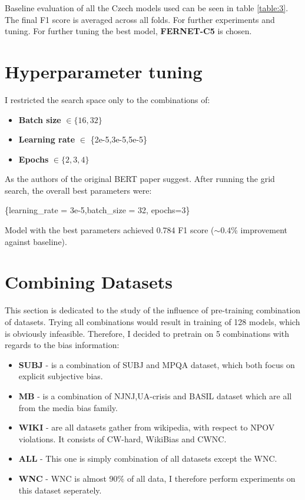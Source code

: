  Baseline evaluation of all the Czech models used can be seen in table \ref{table:3}. The final F1 score is averaged across all folds. For further experiments and tuning. For further tuning the best model, \textbf{FERNET-C5} is chosen.
 

 
 

 
 
 
 
 
 \section{Hyperparameter tuning}
I restricted the search space only to the combinations of:
 \begin{itemize}
     \item \textbf{Batch size} $\in \{16,32\}$
     \item \textbf{Learning rate} $\in $ \{2e-5,3e-5,5e-5\}
     \item \textbf{Epochs} $\in \{2,3,4\}$
 \end{itemize}
 
 As the authors of the original BERT paper suggest.  After running the grid search, the overall best parameters were:
 \begin{center}
      \{learning\_rate = 3e-5,batch\_size = 32, epochs=3\}
 \end{center}
 
 Model with the best parameters achieved 0.784 F1 score ($\sim$0.4\% improvement against baseline).


 
 
  

 \section{Combining Datasets}
This section is dedicated to the study of the influence of pre-training combination of datasets. Trying all combinations would result in training of 128 models, which is obviously infeasible. Therefore, I decided to pretrain on 5 combinations with regards to the bias information:
\begin{itemize}
    \item \textbf{SUBJ} - is a combination of SUBJ and MPQA dataset, which both focus on explicit subjective bias.
    \item \textbf{MB} - is a combination of NJNJ,UA-crisis and BASIL dataset which are all from the media bias family.
    \item \textbf{WIKI} - are all datasets gather from wikipedia, with respect to NPOV violations. It consists of CW-hard, WikiBias and CWNC.
    \item \textbf{ALL} - This one is simply combination of all datasets except the WNC.
    \item \textbf{WNC} - WNC is almost 90\% of all data, I therefore perform experiments on this dataset seperately.
\end{itemize}
 
